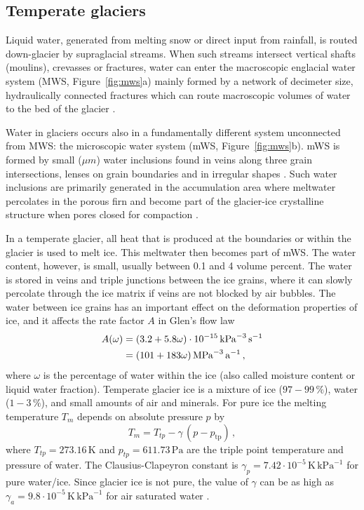 \documentclass[parskip=half]{scrartcl}
\newcommand{\unit}[1]{\ensuremath{\,\mathrm{#1}}}
\begin{document}
\subsection{Temperate glaciers}
\label{sec:temperate-glaciers}

Liquid water, generated from melting snow or direct input from
rainfall, is routed down{-}glacier by supraglacial streams. When such
streams intersect vertical shafts (moulins), crevasses or fractures,
water can enter the macroscopic englacial water system (MWS,
Figure~\ref{fig:mws}a) mainly formed by a network of decimeter size,
hydraulically connected fractures which can route macroscopic volumes
of water to the bed of the glacier
\citep{FountainWalder1998,Fountain2005}.
%

Water in glaciers occurs also in a fundamentally different system
unconnected from MWS: the microscopic water system (mWS,
Figure~\ref{fig:mws}b). mWS is formed by small ($\mu m$) water
inclusions found in veins along three grain intersections, lenses on
grain boundaries and in irregular shapes
\citep{RaymondHarrison1975,Nye1989,Mader1992,FountainWalder1998}. Such
water inclusions are primarily generated in the accumulation area
where meltwater percolates in the porous firn and become part of the
glacier-ice crystalline structure when pores closed for compaction
\citep{Paterson1971,Lliboutry1976,Pettersson2004}.


In a temperate glacier, all heat that is produced at the boundaries or
within the glacier is used to melt ice. This meltwater then becomes
part of mWS. The water content, however, is small, usually between 0.1
and 4 volume percent.  The water is stored in veins and triple
junctions between the ice grains, where it can slowly percolate
through the ice matrix if veins are not blocked by air bubbles.  The
water between ice grains has an important effect on the deformation
properties of ice, and it affects the rate factor $A$ in Glen's flow
law \citep{Duval1977,Paterson1994}
%
\begin{align}
 \label{eq:ratefactor-water} A(\omega) &= (3.2 + 5.8 \omega) \cdot
10^{-15} \unit{kPa}^{-3}\unit{s}^{-1} \notag\\ &= (101 + 183\omega)
\unit{MPa}^{-3}\unit{a}^{-1}\,,
\end{align}
%
where $\omega$ is the percentage of water within the ice (also called
moisture content or liquid water fraction).
%
Temperate glacier ice is a mixture of ice ($97-99\unit{\%}$), water
($1-3\unit{\%}$), and small amounts of air and minerals.  For pure ice
the melting temperature $T_m$ depends on absolute pressure $p$ by
%
\begin{equation}
 \label{eq:clausius-pure} T_m = T_{tp} - \gamma\, (p -
p_{\text{tp}})\,,
\end{equation}
% 
where $T_{tp}=273.16\unit{K}$ and $p_{tp}=611.73\unit{Pa}$ are the
triple point temperature and pressure of water.  The
Clausius-Clapeyron constant is $\gamma_{p}= 7.42 \cdot 10^{-5}
\unit{K}\unit{kPa}^{-1}$ for pure water/ice.  Since glacier ice is not
pure, the value of $\gamma$ can be as high as $\gamma_a = 9.8 \cdot
10^{-5} \unit{K}\unit{kPa}^{-1}$ for air saturated water
\citep{Harrison1975a}.
\end{document}

